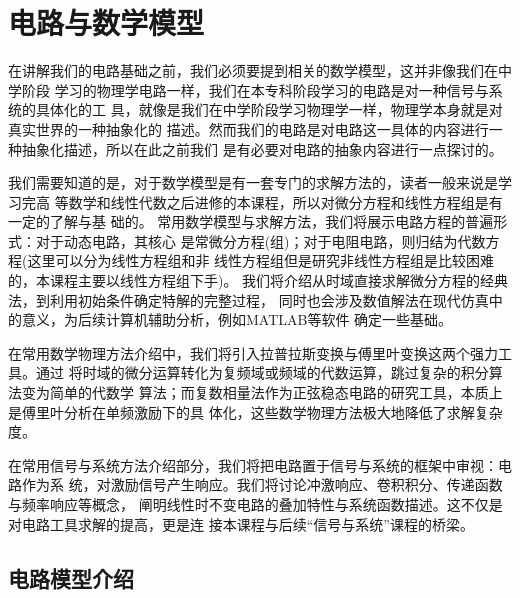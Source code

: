 


\section{电路与数学模型}

    在讲解我们的电路基础之前，我们必须要提到相关的数学模型，这并非像我们在中学阶段
    学习的物理学电路一样，我们在本专科阶段学习的电路是对一种信号与系统的具体化的工
    具，就像是我们在中学阶段学习物理学一样，物理学本身就是对真实世界的一种抽象化的
    描述。然而我们的电路是对电路这一具体的内容进行一种抽象化描述，所以在此之前我们
    是有必要对电路的抽象内容进行一点探讨的。

    我们需要知道的是，对于数学模型是有一套专门的求解方法的，读者一般来说是学习完高
    等数学和线性代数之后进修的本课程，所以对微分方程和线性方程组是有一定的了解与基
    础的。
    常用数学模型与求解方法，我们将展示电路方程的普遍形式：对于动态电路，其核心
    是常微分方程(组)；对于电阻电路，则归结为代数方程(这里可以分为线性方程组和非
    线性方程组但是研究非线性方程组是比较困难的，本课程主要以线性方程组下手)。
    我们将介绍从时域直接求解微分方程的经典法，到利用初始条件确定特解的完整过程，
    同时也会涉及数值解法在现代仿真中的意义，为后续计算机辅助分析，例如MATLAB等软件
    确定一些基础。

    在常用数学物理方法介绍中，我们将引入拉普拉斯变换与傅里叶变换这两个强力工具。通过
    将时域的微分运算转化为复频域或频域的代数运算，跳过复杂的积分算法变为简单的代数学
    算法；而复数相量法作为正弦稳态电路的研究工具，本质上是傅里叶分析在单频激励下的具
    体化，这些数学物理方法极大地降低了求解复杂度。

    在常用信号与系统方法介绍部分，我们将把电路置于信号与系统的框架中审视：电路作为系
    统，对激励信号产生响应。我们将讨论冲激响应、卷积积分、传递函数与频率响应等概念，
    阐明线性时不变电路的叠加特性与系统函数描述。这不仅是对电路工具求解的提高，更是连
    接本课程与后续“信号与系统”课程的桥梁。


    \newpage
    \subsection{电路模型介绍}

